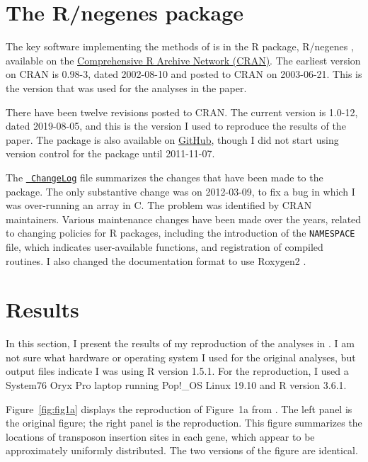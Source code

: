\section{The R/negenes package}

The key software implementing the methods of \citet{lamichhane2003}
is in the R package, R/negenes \citep{negenes}, available on the
\href{https://cran.r-project.org/package=negenes}{Comprehensive R
Archive Network (CRAN)}. The earliest version on CRAN is 0.98-3, dated
2002-08-10 and posted to CRAN on 2003-06-21. This is the version that
was used for the analyses in the paper.

There have been twelve revisions posted to CRAN. The current version
is 1.0-12, dated 2019-08-05, and this is the version I used to
reproduce the results of the paper. The package is also available on
\href{https://github.com/kbroman/negenes}{GitHub}, though I did not
start using version control for the package until 2011-11-07.

The \href{https://github.com/kbroman/negenes/blob/master/ChangeLog}{\tt
ChangeLog} file summarizes the changes that have been made to the
package. The only substantive change was on 2012-03-09, to fix a bug
in which I was over-running an array in C. The problem was identified by
CRAN maintainers. Various maintenance changes have been made over the
years, related to changing policies for R packages, including the
introduction of the {\tt NAMESPACE} file, which indicates
user-available functions, and registration of compiled routines. I
also changed the documentation format to use
Roxygen2 \citep{roxygen2}.


\section{Results}

In this section, I present the results of my reproduction of the analyses
in \citet{lamichhane2003}. I am not sure what hardware or operating
system I used for the original analyses, but output files indicate I
was using R version 1.5.1. For the reproduction, I used a System76
Oryx Pro laptop running Pop!\_OS Linux 19.10 and R version 3.6.1.

Figure~\ref{fig:fig1a} displays the
reproduction of Figure~1a from \citet{lamichhane2003}. The left panel
is the original figure; the right panel is the reproduction. This
figure summarizes the locations of transposon insertion sites in each
gene, which appear to be approximately uniformly distributed. The two
versions of the figure are identical.

